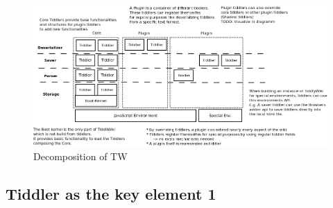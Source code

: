 \documentclass[12pt,a4paper]{scrartcl}
\newcommand{\todo}[1]{{\bf TODO: #1}\\
}
\begin{document}
\begin{figure}[hbtp]
\includegraphics[scale=0.4]{images/overview.png}
\caption{Decomposition of TW}
\end{figure}
\newpage
\subsection{Tiddler as the key element 1}
\end{document}
